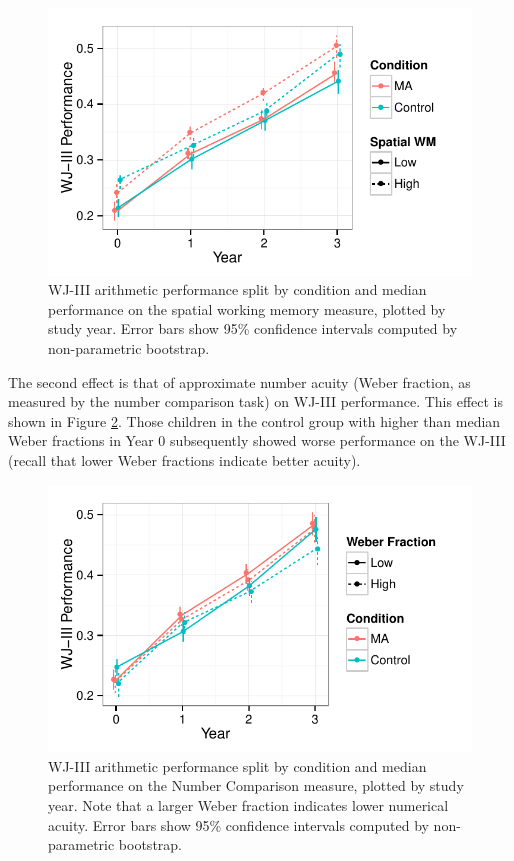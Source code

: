 \documentclass[11pt]{article}
\begin{document}
\begin{figure}[H]
\begin{center}
\includegraphics[width=4.5in]{figures/wj_by_swm.pdf}
\end{center}
\caption{WJ-III arithmetic performance split by condition and median performance on the spatial working memory measure, plotted by study year. Error bars show 95\% confidence intervals computed by non-parametric bootstrap.}
\label{fig:wj3swm}
\end{figure}

The second effect is that of approximate number acuity (Weber fraction, as measured by the number comparison task) on WJ-III performance. This effect is shown in Figure \ref{fig:wj3ans}. Those children in the control group with higher than median Weber fractions in Year 0 subsequently showed worse performance on the WJ-III (recall that lower Weber fractions indicate better acuity).

\begin{figure}[H]
\begin{center}
\includegraphics[width=4.5in]{figures/wj_by_ans.pdf}
\end{center}
\caption{WJ-III arithmetic performance split by condition and median performance on the Number Comparison measure, plotted by study year. Note that a larger Weber fraction indicates lower numerical acuity. Error bars show 95\% confidence intervals computed by non-parametric bootstrap.}
\label{fig:wj3ans}
\end{figure}
\end{document}
